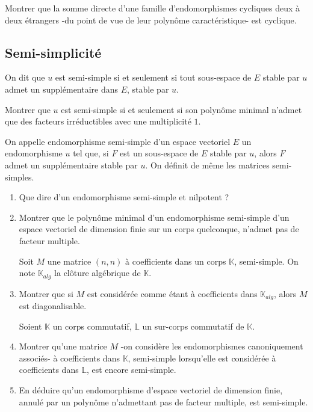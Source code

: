\begin{exer}
Montrer que la somme directe d'une famille d'endomorphismes cycliques deux à deux étrangers %
-du point de vue de leur polynôme caractéristique- est cyclique.
\end{exer}

\subsection{Semi-simplicité}

\begin{exer}
On dit que $u$ est semi-simple si et seulement si tout sous-espace de $E$ stable par $u$ admet un supplémentaire dans $E$, stable par $u$.

Montrer que $u$ est semi-simple si et seulement si son polynôme minimal n'admet que des facteurs irréductibles avec une multiplicité $1$.
\end{exer}

\begin{exer}
On appelle endomorphisme semi-simple d'un espace vectoriel $E$ un endomorphisme $u$ tel que, %
si $F$ est un sous-espace de $E$ stable par $u$, alors $F$ admet un supplémentaire stable par $u$. %
On définit de même les matrices semi-simples.
\begin{enumerate}
\item Que dire d'un endomorphisme semi-simple et nilpotent ?
\item Montrer que le polynôme minimal d'un endomorphisme semi-simple d'un espace vectoriel de dimension finie %
sur un corps quelconque, n'admet pas de facteur multiple.

Soit $M$ une matrice $(n,n)$ à coefficients dans un corps $\mathbb{K}$, semi-simple. %
On note $\mathbb{K}_{alg}$ la clôture algébrique de $\mathbb{K}$.
\item Montrer que si $M$ est considérée comme étant à coefficients dans $\mathbb{K}_{alg}$, alors $M$ est diagonalisable.

Soient $\mathbb{K}$ un corps commutatif, $\mathbb{L}$ un sur-corps commutatif de $\mathbb{K}$.
\item Montrer qu'une matrice $M$ -on considère les endomorphismes canoniquement associés- à coefficients dans $\mathbb{K}$, %
semi-simple lorsqu'elle est considérée à coefficients dans $\mathbb{L}$, est encore semi-simple.
\item En déduire qu'un endomorphisme d'espace vectoriel de dimension finie, annulé par un polynôme n'admettant pas de facteur multiple, est semi-simple.
\end{enumerate}
\end{exer}

